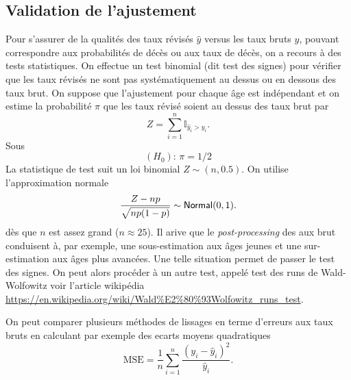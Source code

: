 \subsection{Validation de l'ajustement}
Pour s'assurer de la qualités des taux révisés $\widehat{y}$ versus les taux bruts $y$, pouvant correspondre aux probabilités de décès ou aux taux de décès, on a recours à des tests statistiques. On effectue un test binomial (dit test des signes) pour vérifier que les taux révisés ne sont pas systématiquement au dessus ou en dessous des taux brut. On suppose que l'ajustement pour chaque âge est indépendant et on estime la probabilité $\pi$ que les taux révisé soient au dessus des taux brut par 
$$
Z = \sum_{i=1}^n\mathbb{I}_{\widehat{y}_i>y_i}.
$$
Sous 
$$
(H_0)\text{: }\pi = 1/2
$$
La statistique de test suit un loi binomial $Z\sim(n, 0.5)$. On utilise l'approximation normale 
$$
\frac{Z - np}{\sqrt{np(1-p)}}\sim\mathsf{Normal}(0,1).
$$
dès que $n$ est assez grand ($n\approx 25$). Il arive que le \textit{post-processing} des aux brut conduisent à, par exemple, une sous-estimation aux âges jeunes et une sur-estimation aux âges plus avancées. Une telle situation permet de passer le test des signes. On peut alors procéder à un autre test, appelé test des runs de Wald-Wolfowitz voir l'article wikipédia \url{https://en.wikipedia.org/wiki/Wald%E2%80%93Wolfowitz_runs_test}.

On peut comparer plusieurs méthodes de lissages en terme d'erreurs aux taux bruts en calculant par exemple des ecarts moyens quadratiques
$$
\text{MSE} = \frac{1}{n}\sum_{i = 1}^n\frac{(y_i -\widehat{y}_i)^2}{\widehat{y}_i}.
$$

